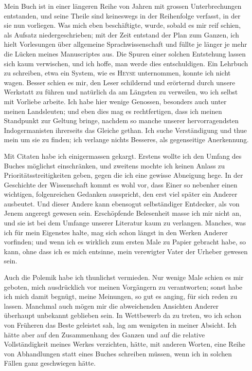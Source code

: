 
Mein Buch ist in einer längeren Reihe von Jahren mit grossen Unterbrechungen entstanden, und seine Theile sind keineswegs in der Reihenfolge verfasst, in der sie nun vorliegen. Was mich eben beschäftigte, wurde, sobald es mir reif schien, als Aufsatz niedergeschrieben; mit der Zeit entstand der Plan zum Ganzen, ich hielt Vorlesungen über allgemeine Sprachwissenschaft und füllte je länger je mehr die Lücken meines Manuscriptes aus. Die Spuren einer solchen Entstehung lassen sich kaum verwischen, und ich hoffe, man werde dies entschuldigen. Ein Lehrbuch zu schreiben, etwa ein System, wie es \textsc{Heyse} unternommen, konnte ich nicht wagen. Besser schien es mir, den Leser schildernd und erörternd durch unsere Werkstatt zu führen und natürlich da am Längsten zu verweilen, wo ich selbst mit Vorliebe arbeite. Ich habe hier wenige Genossen, besonders auch unter meinen Landsleuten; und eben dies mag es rechtfertigen, dass ich meinen Standpunkt zur Geltung bringe, nachdem so manche unserer hervorragendsten Indogermanisten ihrerseits das Gleiche gethan. Ich suche Verständigung und thue mein  um sie zu finden; ich verlange nichts Besseres, als gegenseitige Anerkennung.

Mit Citaten habe ich einigermassen gekargt. Erstens wollte ich den Umfang des Buches möglichst einschränken, und zweitens mochte ich keinen Anlass zu Prioritätsstreitigkeiten geben, gegen die ich eine gewisse Abneigung hege. In der Geschichte der Wissenschaft kommt es wohl vor, dass Einer so nebenher einen wichtigen, folgenreichen Gedanken ausspricht, den erst viel später ein Anderer ausbeutet. Und dieser Andere kann ebensogut selbständiger Entdecker, als von Jenem angeregt gewesen sein. Erschöpfende Belesenheit masse ich mir nicht an, und sie ist bei  dem Umfange unserer Literatur kaum zu verlangen. Manches, was ich für mein Eigenstes halte, mag sich schon längst in den Werken Anderer vorfinden; und wenn ich es wirklich zum ersten Male zu Papier gebracht habe, so kann, ohne dass ich es mich entsinne, mein verewigter Vater der Urheber gewesen sein.

Auch die Polemik habe ich thunlichst vermieden. Nur wenige Male schien es mir geboten, mich ausdrücklich vor meinen Vorgängern zu verantworten; sonst habe ich mich damit begnügt, meine Meinungen, so gut es anging, für sich reden zu lassen. Manchmal auch mögen mir die abweichenden Ansichten Anderer überhaupt unbekannt geblieben sein. In Wettbewerb da zu treten, wo ich schon von Früheren das Beste geleistet sah, lag am wenigsten in meiner Absicht. Ich hätte aber auf den Zusammenhang des Ganzen und auf die relative Vollständigkeit meines Werkes verzichten, hätte, mit anderen Worten, eine Reihe von Abhandlungen statt eines Buches schreiben müssen, wenn ich in solchen Fällen ganz geschwiegen hätte.

